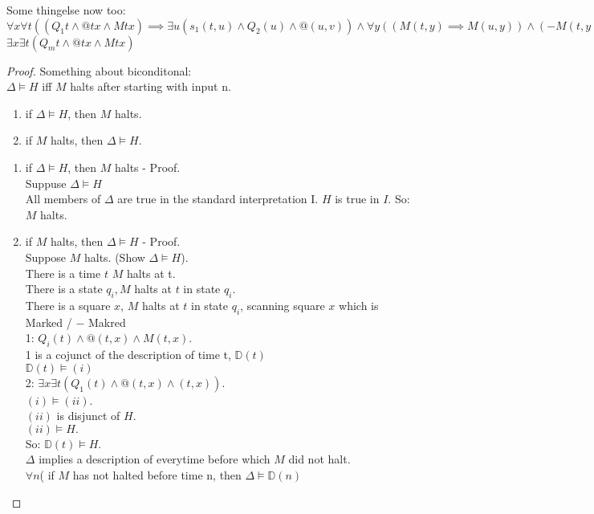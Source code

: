Some thingelse now too:\\
$\forall x \forall t ((Q_1 t \wedge @tx \wedge Mtx ) \implies \exists u ( s_1 (t , u) \wedge Q_2(u) \wedge @ (u,v)) \wedge \forall y ((M(t,y) \implies M(u,y)) \wedge (-M(t,y) \implies - M(u,y)))))$ \\
$\exists x \exists t ( Q_mt \wedge @tx \wedge Mtx)$\\


\begin{proof}
Something about biconditonal:\\
$\Delta \vDash H$ iff $M$ halts after starting with input n.
\begin{enumerate}
\item if $\Delta \vDash H$, then $M$ halts.
\item if $M$ halts, then $\Delta \vDash H$.
\end{enumerate}
\begin{enumerate}
\item if $\Delta \vDash H$, then $M$ halts - Proof. \\
Suppuse $\Delta \vDash H$ \\
All members of $\Delta$ are true in the standard interpretation I.
$H$ is true in $I$.
So: $M$ halts.
\item if $M$ halts, then $\Delta \vDash H$ - Proof. \\
Suppose $M$ halts. (Show $\Delta \vDash H$). \\
There is a time \underline{$t$} $M$ halts at t. \\
There is a state $q_i, M$ halts at $t$ in state $q_i$. \\
There is a square $x$, $M$ halts at $t$ in state $q_i$, scanning square $x$ which is Marked / $-$ Makred \\
1: $Q_i(t) \wedge @(t,x) \wedge M(t,x)$. \\
1 is a cojunct of the description of time t, $\mathbb{D}(t)$ \\
$\mathbb{D}(t) \vDash (i)$ \\

2: $\exists x \exists t (Q_1(t) \wedge @ (t,x) \wedge (t,x))$. \\

$(i) \vDash (ii)$. \\
$(ii)$ is disjunct of $H$. \\
$(ii) \vDash H.$ \\
So: $\mathbb{D}(t) \vDash H$. \\


$\Delta$ implies a description of everytime before which $M$ did not halt. \\
$\forall n$( if $M$ has not halted before time n, then $\Delta \vDash \mathbb{D}(n)$ \\
\end{enumerate}
\end{proof}


